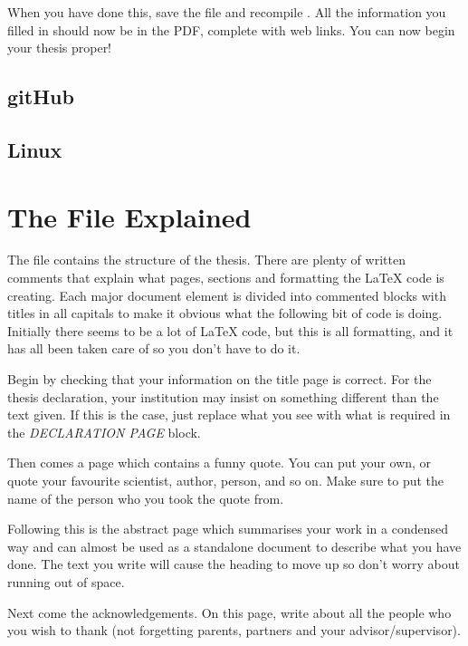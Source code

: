 When you have done this, save the file and recompile . All the information you filled in should now be in the PDF, complete with web links. You can now begin your thesis proper!

\subsection{gitHub}

\subsection{Linux}


\section{The  File Explained}

The  file contains the structure of the thesis. There are plenty of written comments that explain what pages, sections and formatting the \LaTeX{} code is creating. Each major document element is divided into commented blocks with titles in all capitals to make it obvious what the following bit of code is doing. Initially there seems to be a lot of \LaTeX{} code, but this is all formatting, and it has all been taken care of so you don't have to do it.

Begin by checking that your information on the title page is correct. For the thesis declaration, your institution may insist on something different than the text given. If this is the case, just replace what you see with what is required in the \emph{DECLARATION PAGE} block.

Then comes a page which contains a funny quote. You can put your own, or quote your favourite scientist, author, person, and so on. Make sure to put the name of the person who you took the quote from.

Following this is the abstract page which summarises your work in a condensed way and can almost be used as a standalone document to describe what you have done. The text you write will cause the heading to move up so don't worry about running out of space.

Next come the acknowledgements. On this page, write about all the people who you wish to thank (not forgetting parents, partners and your advisor/supervisor).

